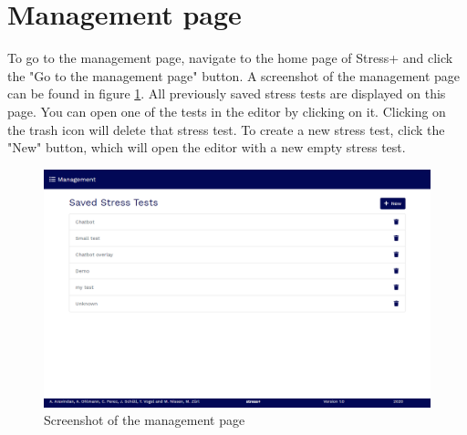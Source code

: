 \section{Management page}
\label{sec:management-page}

To go to the management page, navigate to the home page of Stress+ and click the "Go to the management page" button.
A screenshot of the management page can be found in figure \ref{fig:screenshot-management-page}.
All previously saved stress tests are displayed on this page.
You can open one of the tests in the editor by clicking on it.
Clicking on the trash icon will delete that stress test.
To create a new stress test, click the "New" button, which will open the editor with a new empty stress test.

\begin{figure}[htb]
    \centering
    \includegraphics[width=\textwidth]{figures/screenshot-management-page.png}
    \caption{Screenshot of the management page}
    \label{fig:screenshot-management-page}
\end{figure}
